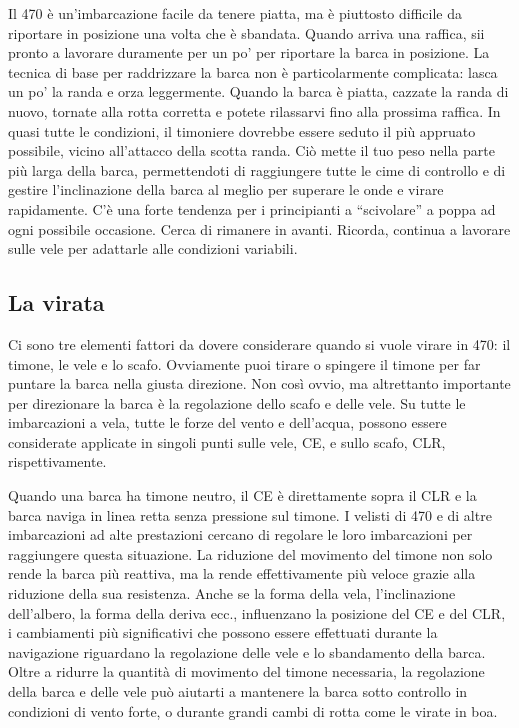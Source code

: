Il 470 è un'imbarcazione facile da tenere piatta, ma è piuttosto difficile da
riportare in posizione una volta che è sbandata. Quando arriva una raffica, sii
pronto a lavorare duramente per un po' per riportare la barca in posizione. La
tecnica di base per raddrizzare la barca non è particolarmente complicata: lasca
un po' la randa e orza leggermente. Quando la barca è piatta, cazzate la randa
di nuovo, tornate alla rotta corretta e potete rilassarvi fino alla prossima
raffica. In quasi tutte le condizioni, il timoniere dovrebbe essere seduto il
più appruato possibile, vicino all'attacco della scotta randa. Ciò mette il tuo
peso nella parte più larga della barca, permettendoti di raggiungere tutte le
cime di controllo e di gestire l'inclinazione della barca al meglio per superare
le onde e virare rapidamente. C'è una forte tendenza per i principianti a
``scivolare'' a poppa ad ogni possibile occasione. Cerca di rimanere in avanti.
Ricorda, continua a lavorare sulle vele per adattarle alle condizioni variabili.

\subsection{La virata}
\label{subsec:LaVirata}
Ci sono tre elementi fattori da dovere considerare quando si vuole virare in
470: il timone, le vele e lo scafo. Ovviamente puoi tirare o spingere il timone
per far puntare la barca nella giusta direzione. Non così ovvio, ma altrettanto
importante per direzionare la barca è la regolazione dello scafo e delle vele.
Su tutte le imbarcazioni a vela, tutte le forze del vento e dell'acqua, possono
essere considerate applicate in singoli punti sulle vele, \ac{CE}, e sullo
scafo, \ac{CLR}, rispettivamente.

Quando una barca ha timone neutro, il \ac{CE} è direttamente sopra il \ac{CLR} e
la barca naviga in linea retta senza pressione sul timone. I velisti di 470 e di
altre imbarcazioni ad alte prestazioni cercano di regolare le loro imbarcazioni
per raggiungere questa situazione. La riduzione del movimento del timone non
solo rende la barca più reattiva, ma la rende effettivamente più veloce grazie
alla riduzione della sua resistenza. Anche se la forma della vela,
l'inclinazione dell'albero, la forma della deriva ecc., influenzano la posizione
del \ac{CE} e del \ac{CLR}, i cambiamenti più significativi che possono essere
effettuati durante la navigazione riguardano la regolazione delle vele e lo
sbandamento della barca. Oltre a ridurre la quantità di movimento del timone
necessaria, la regolazione della barca e delle vele può aiutarti a mantenere la
barca sotto controllo in condizioni di vento forte, o durante grandi cambi di
rotta come le virate in boa.

